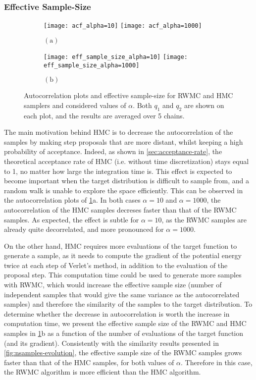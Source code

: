 \documentclass[a4paper, 12pt,oneside]{article}
\begin{document}
		\subsubsection{Effective Sample-Size}
		\begin{figure}[htb]
			\begin{subfigure}[b]{\textwidth}
				\centering
				\texttt{[image: acf\_alpha=10]}
				\texttt{[image: acf\_alpha=1000]}
				\caption*{$\mathrm{(a)}$}
			\end{subfigure}
			\begin{subfigure}[b]{\textwidth}
				\centering
				\texttt{[image: eff\_sample\_size\_alpha=10]}
				\texttt{[image: eff\_sample\_size\_alpha=1000]}
				\caption*{$\mathrm{(b)}$}
			\end{subfigure}
			\caption{Autocorrelation plots and effective sample-size for RWMC and HMC samplers and considered values of $\alpha$. Both $q_1$ and $q_2$ are shown on each plot, and the results are averaged over 5 chains.}
			\label{fig:acf-ess}
		\end{figure}
		The main motivation behind HMC is to decrease the autocorrelation of the samples by making step proposals that are more distant, whilst keeping a high probability of acceptance. Indeed, as shown in \ref{sec:acceptance-rate}, the theoretical acceptance rate of HMC (i.e. without time discretization) stays equal to 1, no matter how large the integration time is. This effect is expected to become important when the target distribution is difficult to sample from, and a random walk is unable to explore the space efficiently.
		This can be observed in the autocorrelation plots of \ref{fig:acf-ess}a. In both cases $\alpha=10$ and $\alpha=1000$, the autocorrelation of the HMC samples decreses faster than that of the RWMC samples. As expected, the effect is subtle for $\alpha=10$, as the RWMC samples are already quite decorrelated, and more pronounced for $\alpha=1000$.

		On the other hand, HMC requires more evaluations of the target function to generate a sample, as it needs to compute the gradient of the potential energy twice at each step of Verlet's method, in addition to the evaluation of the proposal step. This computation time could be used to generate more samples with RWMC, which would increase the effective sample size (number of independent samples that would give the same variance as the autocorrelated samples) and therefore the similarity of the samples to the target distribution.
		To determine whether the decrease in autocorrelation is worth the increase in computation time, we present the effective sample size of the RWMC and HMC samples in \ref{fig:acf-ess}b as a function of the number of evaluations of the target function (and its gradient).
		Consistently with the similarity results presented in \ref{fig:nsamples-evolution}, the effective sample size of the RWMC samples grows faster than that of the HMC samples, for both values of $\alpha$. Therefore in this case, the RWMC algorithm is more efficient than the HMC algorithm.
		
\end{document}
